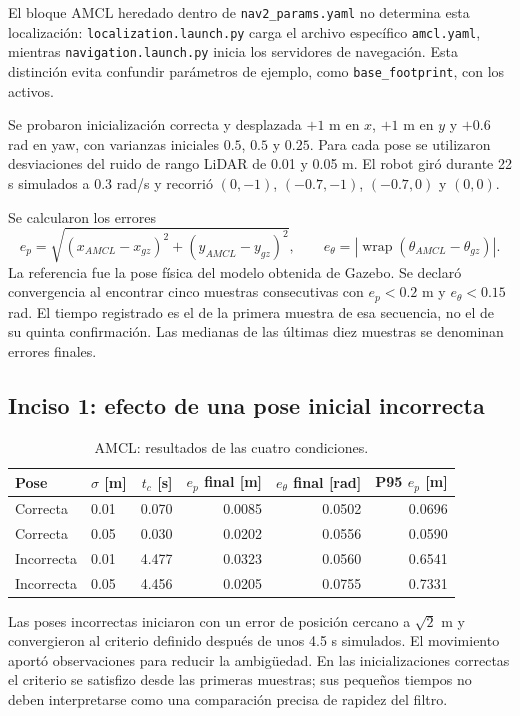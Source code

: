 \documentclass[11pt,a4paper]{article}
\newcommand{\archivo}[1]{\nolinkurl{#1}}
\begin{document}
El bloque AMCL heredado dentro de \archivo{nav2_params.yaml} no determina esta localización: \archivo{localization.launch.py} carga el archivo específico \archivo{amcl.yaml}, mientras \archivo{navigation.launch.py} inicia los servidores de navegación. Esta distinción evita confundir parámetros de ejemplo, como \archivo{base_footprint}, con los activos.

Se probaron inicialización correcta y desplazada $+1$ m en $x$, $+1$ m en $y$ y $+0.6$ rad en yaw, con varianzas iniciales $0.5$, $0.5$ y $0.25$. Para cada pose se utilizaron desviaciones del ruido de rango LiDAR de 0.01 y 0.05 m. El robot giró durante 22 s simulados a 0.3 rad/s y recorrió $(0,-1)$, $(-0.7,-1)$, $(-0.7,0)$ y $(0,0)$.

Se calcularon los errores
\begin{equation}
e_p=\sqrt{(x_{AMCL}-x_{gz})^2+(y_{AMCL}-y_{gz})^2},\qquad
e_\theta=|\operatorname{wrap}(\theta_{AMCL}-\theta_{gz})|.
\end{equation}
La referencia fue la pose física del modelo obtenida de Gazebo. Se declaró convergencia al encontrar cinco muestras consecutivas con $e_p<0.2$ m y $e_\theta<0.15$ rad. El tiempo registrado es el de la primera muestra de esa secuencia, no el de su quinta confirmación. Las medianas de las últimas diez muestras se denominan errores finales.

\subsection{Inciso 1: efecto de una pose inicial incorrecta}
\begin{table}[H]\centering\caption{AMCL: resultados de las cuatro condiciones.}
\begin{tabular}{llrrrr}\toprule
Pose & $\sigma$ [m] & $t_c$ [s] & $e_p$ final [m] & $e_\theta$ final [rad] & P95 $e_p$ [m]\\\midrule
Correcta & 0.01 & 0.070 & 0.0085 & 0.0502 & 0.0696\\
Correcta & 0.05 & 0.030 & 0.0202 & 0.0556 & 0.0590\\
Incorrecta & 0.01 & 4.477 & 0.0323 & 0.0560 & 0.6541\\
Incorrecta & 0.05 & 4.456 & 0.0205 & 0.0755 & 0.7331\\\bottomrule
\end{tabular}\end{table}
Las poses incorrectas iniciaron con un error de posición cercano a $\sqrt{2}$ m y convergieron al criterio definido después de unos 4.5 s simulados. El movimiento aportó observaciones para reducir la ambigüedad. En las inicializaciones correctas el criterio se satisfizo desde las primeras muestras; sus pequeños tiempos no deben interpretarse como una comparación precisa de rapidez del filtro.
\end{document}
